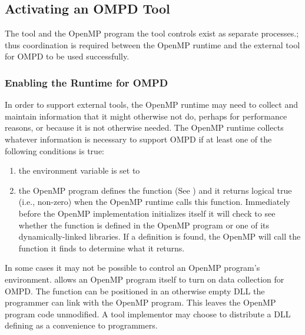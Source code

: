 \subsection{Activating an OMPD Tool}
\label{sec:ompd:activating}

The tool and the OpenMP program the tool controls
exist as separate processes.; thus coordination is required between the OpenMP runtime
and the external tool for OMPD to be used successfully.

\subsubsection{Enabling the Runtime for OMPD}
\label{sec:ompd:enabling-ompd}

In order to support external tools, the OpenMP runtime may need to collect
and maintain information that it might otherwise not do, perhaps
for performance reasons, or because it is not otherwise needed.
The OpenMP runtime collects whatever information is necessary
to support OMPD if at least one of the following conditions is true:
\begin{enumerate}
\item
  the environment variable  is set to 
\item
  the OpenMP program defines the function
  (See )
  and it returns logical true (i.e., non-zero) when
  the OpenMP runtime calls this function.
  Immediately before the OpenMP implementation initializes itself
  it will check to see whether the  function
  is defined in the OpenMP program or one of its dynamically-linked libraries.
  If a definition is found, the OpenMP will call the function it finds to determine what it returns.
\end{enumerate}
In some cases it may not be possible to control an OpenMP program's
environment.
 allows an OpenMP program itself to turn on
data collection for OMPD.
The function can be positioned in an otherwise empty DLL the
programmer can link with the OpenMP program.
This leaves the OpenMP program code unmodified.
A tool implementor may choose to distribute a DLL defining
 as a convenience to programmers.

